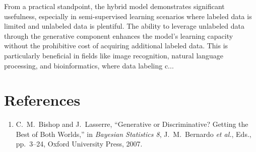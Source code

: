 \documentclass[12pt]{article}
\begin{document}
From a practical standpoint, the hybrid model demonstrates significant usefulness, especially in semi-supervised learning scenarios where labeled data is limited and unlabeled data is plentiful. The ability to leverage unlabeled data through the generative component enhances the model's learning capacity without the prohibitive cost of acquiring additional labeled data. This is particularly beneficial in fields like image recognition, natural language processing, and bioinformatics, where data labeling c...

\section*{References}

\begin{enumerate}
    \item C.~M.~Bishop and J.~Lasserre, ``Generative or Discriminative? Getting the Best of Both Worlds,'' in \emph{Bayesian Statistics 8}, J.~M.~Bernardo \emph{et al.}, Eds., pp.~3--24, Oxford University Press, 2007.
\end{enumerate}
\end{document}
